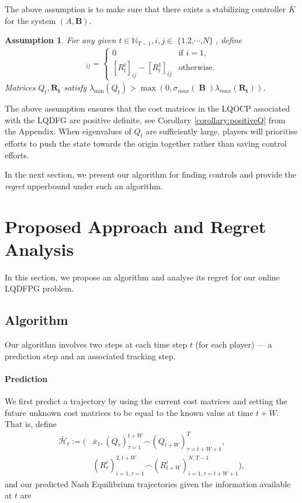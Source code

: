 \documentclass[letterpaper, 10 pt, conference]{ieeeconf}  %
\DeclareMathOperator{\contB}{\mathbf{B}}
\DeclareMathOperator{\Nplayers}{\{1,2,\cdots,\textit{N}\}}
\newtheorem{assumption}{Assumption}
\begin{document}
The above assumption is to make sure that there exists a stabilizing controller $\bar{K}$ for the system $(A,\mathbf{B})$.
\begin{assumption}\label{assumption:lowerQ}
    For any given $t \in \mathbb{N}_{T-1}, i,j\in \Nplayers$, define
    \begin{align*}
        [\mathbf{R_{t}}]_{ij} = 
        \begin{cases}
            0 & \text{if $i = 1$,}\\
            [R_{t}^{i}]_{ij}-[R_{t}^{1}]_{ij} & \text{otherwise}.
        \end{cases}
    \end{align*}
    Matrices $Q_{t}, \mathbf{R_{t}}$ satisfy
        $\lambda_{\min}(Q_{t}) > \max(0,\sigma_{max}(\contB)\lambda_{max}(\mathbf{R_{t}}))$.
\end{assumption}
The above assumption ensures that the cost matrices in the LQOCP associated with the LQDFG are positive definite, see Corollary \ref{corollary:positiveQ} from the Appendix. {\color{red} When eigenvalues of $Q_{t}$ are sufficiently large, players will prioritise efforts to push the state towards the origin together rather than saving control efforts.}

In the next section, we present our algorithm for finding controls and provide the \emph{regret} upperbound under such an algorithm.

\section{Proposed Approach and Regret Analysis}\label{sec:approach}
In this section, we propose an algorithm and analyse its regret for our online LQDFPG problem.

\subsection{Algorithm}

Our algorithm involves two steps at each time step $t$ (for each player) --- a prediction step and an associated tracking step.

\paragraph{Prediction} 

We first predict a trajectory by using the current cost matrices and setting the future unknown cost matrices to be equal to the known value at time $t+W$. That is, define 
\begin{equation*}
\begin{split}
    \bar{\mathcal{H}}_{t} := (&\bar{x}_{1}, (Q_{\tau})_{\tau=1}^{t+W} \frown(Q_{t+W})_{\tau=t+W+1}^{T},\\
    &(R_{\tau}^{i})_{i=1,\tau=1}^{2,t+W} \frown(R_{t+W}^{i})_{i=1,\tau=t+W+1}^{N,T-1}),
\end{split}
\end{equation*}
and our predicted Nash Equilibrium trajectories given the information available at $t$ are
\end{document}
